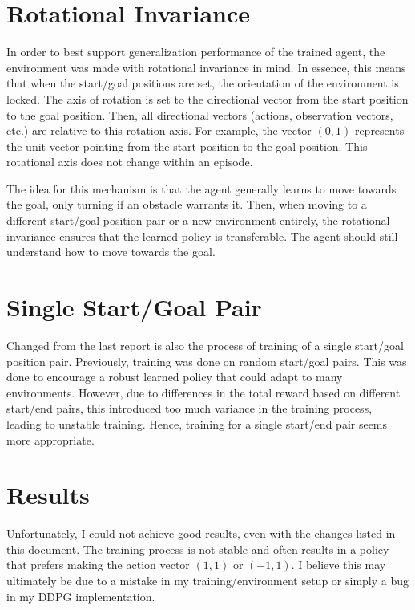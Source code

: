 \section{Rotational Invariance}
    In order to best support generalization performance of the trained agent, the environment was made with rotational
    invariance in mind. In essence, this means that when the start/goal positions are set, the orientation of the
    environment is locked. The axis of rotation is set to the directional vector from the start position to the goal position.
    Then, all directional vectors (actions, observation vectors, etc.) are relative to this rotation axis. For example, the
    vector $(0, 1)$ represents the unit vector pointing from the start position to the goal position. This rotational axis does
    not change within an episode.

    The idea for this mechanism is that the agent generally learns to move towards the goal, only turning if an obstacle warrants
    it. Then, when moving to a different start/goal position pair or a new environment entirely, the rotational invariance ensures
    that the learned policy is transferable. The agent should still understand how to move towards the goal.

\section{Single Start/Goal Pair}
    Changed from the last report is also the process of training of a single start/goal position pair. Previously, training was
    done on random start/goal pairs. This was done to encourage a robust learned policy that could adapt to many environments. However,
    due to differences in the total reward based on different start/end pairs, this introduced too much variance in the training process,
    leading to unstable training. Hence, training for a single start/end pair seems more appropriate.

\section{Results}
    Unfortunately, I could not achieve good results, even with the changes listed in this document. The training process is not
    stable and often results in a policy that prefers making the action vector $(1, 1)$ or $(-1, 1)$. I believe this may ultimately
    be due to a mistake in my training/environment setup or simply a bug in my DDPG implementation.

